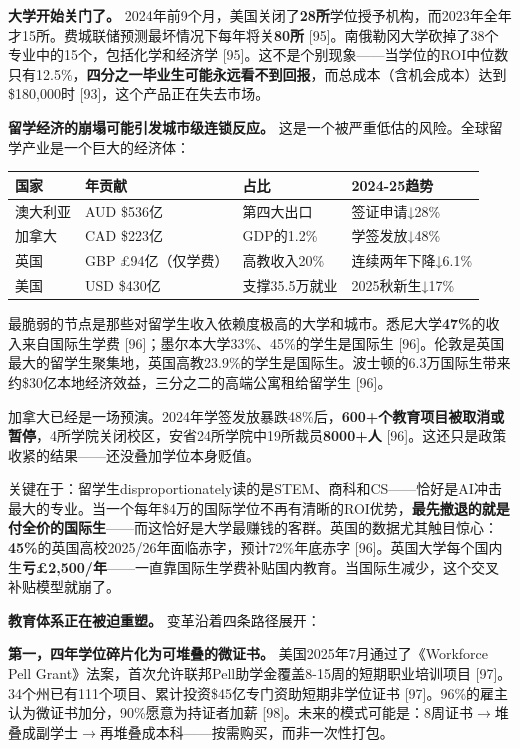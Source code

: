 \documentclass[11pt,a4paper]{ctexart}
\begin{document}
\textbf{大学开始关门了。} 2024年前9个月，美国关闭了\textbf{28所}学位授予机构，而2023年全年才15所。费城联储预测最坏情况下每年将关\textbf{80所}{} [95]。南俄勒冈大学砍掉了38个专业中的15个，包括化学和经济学 [95]。这不是个别现象——当学位的ROI中位数只有12.5\%，\textbf{四分之一毕业生可能永远看不到回报}，而总成本（含机会成本）达到\$180,000时 [93]，这个产品正在失去市场。

\textbf{留学经济的崩塌可能引发城市级连锁反应。} 这是一个被严重低估的风险。全球留学产业是一个巨大的经济体：

\begin{center}

\begin{tabularx}{\textwidth}{lXXX}
\toprule
国家 & 年贡献 & 占比 & 2024-25趋势 \\
\midrule
澳大利亚 & AUD \$536亿 & 第四大出口 & 签证申请↓28\% \\
加拿大 & CAD \$223亿 & GDP的1.2\% & 学签发放↓48\% \\
英国 & GBP £94亿（仅学费） & 高教收入20\% & 连续两年下降↓6.1\% \\
美国 & USD \$430亿 & 支撑35.5万就业 & 2025秋新生↓17\% \\
\bottomrule
\end{tabularx}
\end{center}

最脆弱的节点是那些对留学生收入依赖度极高的大学和城市。悉尼大学\textbf{47\%}的收入来自国际生学费 [96]；墨尔本大学33\%、45\%的学生是国际生 [96]。伦敦是英国最大的留学生聚集地，英国高教23.9\%的学生是国际生。波士顿的6.3万国际生带来约\$30亿本地经济效益，三分之二的高端公寓租给留学生 [96]。

加拿大已经是一场预演。2024年学签发放暴跌48\%后，\textbf{600+个教育项目被取消或暂停}，4所学院关闭校区，安省24所学院中19所裁员\textbf{8000+人}{} [96]。这还只是政策收紧的结果——还没叠加学位本身贬值。

关键在于：留学生disproportionately读的是STEM、商科和CS——恰好是AI冲击最大的专业。当一个每年\$4万的国际学位不再有清晰的ROI优势，\textbf{最先撤退的就是付全价的国际生}——而这恰好是大学最赚钱的客群。英国的数据尤其触目惊心：\textbf{45\%}的英国高校2025/26年面临赤字，预计72\%年底赤字 [96]。英国大学每个国内生\textbf{亏£2,500/年}——一直靠国际生学费补贴国内教育。当国际生减少，这个交叉补贴模型就崩了。

\textbf{教育体系正在被迫重塑。} 变革沿着四条路径展开：

\textbf{第一，四年学位碎片化为可堆叠的微证书。} 美国2025年7月通过了《Workforce Pell Grant》法案，首次允许联邦Pell助学金覆盖8-15周的短期职业培训项目 [97]。34个州已有111个项目、累计投资\$45亿专门资助短期非学位证书 [97]。96\%的雇主认为微证书加分，90\%愿意为持证者加薪 [98]。未来的模式可能是：8周证书$\to$堆叠成副学士$\to$再堆叠成本科——按需购买，而非一次性打包。
\end{document}

